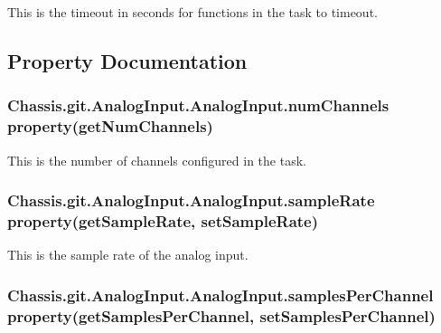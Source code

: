 This is the timeout in seconds for functions in the task to timeout. 



\subsection{Property Documentation}
\hypertarget{class_chassis_8git_1_1_analog_input_1_1_analog_input_ab520bf23d3d0edf2cd7583b93eee593a}{
\subsubsection[{num\-Channels}]{\setlength{\rightskip}{0pt plus 5cm}Chassis.\-git.\-Analog\-Input.\-Analog\-Input.\-num\-Channels property({\bf get\-Num\-Channels})\hspace{0.3cm}{\ttfamily [static]}}}\label{class_chassis_8git_1_1_analog_input_1_1_analog_input_ab520bf23d3d0edf2cd7583b93eee593a}


This is the number of channels configured in the task. 

\hypertarget{class_chassis_8git_1_1_analog_input_1_1_analog_input_a4850b3ba42ea425bd1ecff3bee19e788}{
\subsubsection[{sample\-Rate}]{\setlength{\rightskip}{0pt plus 5cm}Chassis.\-git.\-Analog\-Input.\-Analog\-Input.\-sample\-Rate property({\bf get\-Sample\-Rate}, {\bf set\-Sample\-Rate})\hspace{0.3cm}{\ttfamily [static]}}}\label{class_chassis_8git_1_1_analog_input_1_1_analog_input_a4850b3ba42ea425bd1ecff3bee19e788}


This is the sample rate of the analog input. 

\hypertarget{class_chassis_8git_1_1_analog_input_1_1_analog_input_a2a0d9c7ca2844846004487e801df19f5}{
\subsubsection[{samples\-Per\-Channel}]{\setlength{\rightskip}{0pt plus 5cm}Chassis.\-git.\-Analog\-Input.\-Analog\-Input.\-samples\-Per\-Channel property({\bf get\-Samples\-Per\-Channel}, {\bf set\-Samples\-Per\-Channel})\hspace{0.3cm}{\ttfamily [static]}}}\label{class_chassis_8git_1_1_analog_input_1_1_analog_input_a2a0d9c7ca2844846004487e801df19f5}


